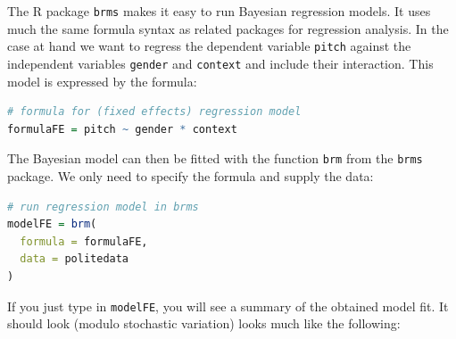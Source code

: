 \documentclass[nobib]{tufte-handout}
\begin{document}
The R package \texttt{brms} \citep{buerkner2016brms} makes it easy to run Bayesian regression models. It uses much the same formula syntax as related packages for regression analysis. In the case at hand we want to regress the dependent variable \texttt{pitch} against the independent variables \texttt{gender} and \texttt{context} and include their interaction. This model is expressed by the formula:

\begin{minipage}[]{\textwidth}
\begin{lstlisting}[language=R]
# formula for (fixed effects) regression model
formulaFE = pitch ~ gender * context
\end{lstlisting}
\end{minipage}

The Bayesian model can then be fitted with the function \texttt{brm} from the \texttt{brms} package. We only need to specify the formula and supply the data:

\begin{minipage}[]{\textwidth}
\begin{lstlisting}[language=R]
# run regression model in brms
modelFE = brm(
  formula = formulaFE,
  data = politedata
)
\end{lstlisting}
\end{minipage}

If you just type in \texttt{modelFE}, you will see a summary of the obtained model fit. It should look (modulo stochastic variation) looks much like the following:

\medskip
\end{document}
